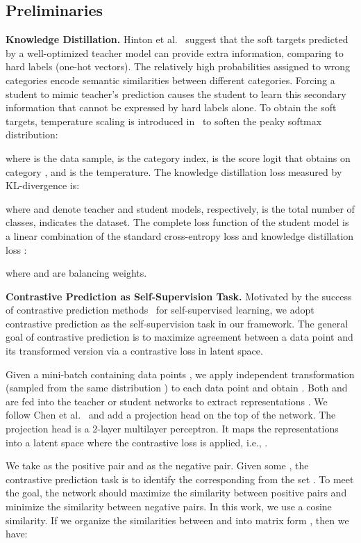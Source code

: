 \documentclass[runningheads]{llncs}
\newcommand{\etal}{et al.}
\newcommand{\ie}{i.e.}
\begin{document}
\subsection{Preliminaries}
\label{sec:preliminaries}

\noindent
\textbf{Knowledge Distillation.}
Hinton \etal~\cite{KD} suggest that the soft targets predicted by a well-optimized teacher model can provide extra information, comparing to hard labels (one-hot vectors).
The relatively high probabilities assigned to wrong categories encode semantic similarities between different categories. Forcing a student to mimic teacher's prediction causes the student to learn this secondary information that cannot be expressed by hard labels alone.
To obtain the soft targets, temperature scaling is introduced in~\cite{KD} to soften the peaky softmax distribution:

where  is the data sample,  is the category index,  is the score logit that  obtains on category , and  is the temperature.
The knowledge distillation loss  measured by KL-divergence is:

where  and  denote teacher and student models, respectively,  is the total number of classes,  indicates the dataset.
The complete loss function  of the student model is a linear combination of the standard cross-entropy loss  and knowledge distillation loss :

where  and  are balancing weights.


\vspace{0.2cm}
\noindent
\textbf{Contrastive Prediction as Self-Supervision Task.}
Motivated by the success of contrastive prediction methods~\cite{SimCLR,cpcpp,PIRL,cpc,cmc} for self-supervised learning, we adopt contrastive prediction as the self-supervision task in our framework.
The general goal of contrastive prediction is to maximize agreement between a data point and its transformed version via a contrastive loss in latent space.


Given a mini-batch containing  data points , we apply independent transformation  (sampled from the same distribution ) to each data point and obtain . 
Both  and  are fed into the teacher or student networks to extract representations . 
We follow Chen \etal~\cite{SimCLR} and add a projection head on the top of the network. 
The projection head is a 2-layer multilayer perceptron. It maps the representations into a latent space where the contrastive loss is applied, \ie, .

We take  as the positive pair and  as the negative pair. Given some , the contrastive prediction task is to identify the corresponding  from the set . 
To meet the goal, the network should maximize the similarity between positive pairs and minimize the similarity between negative pairs. 
In this work, we use a cosine similarity. If we organize the similarities between  and  into matrix form , then we have:
\end{document}
